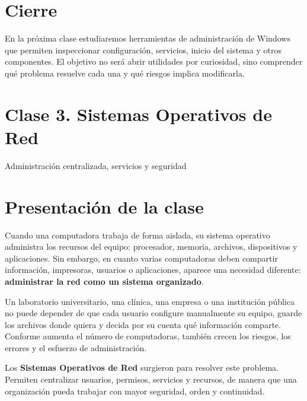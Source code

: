 \documentclass[
  spanish,
  letterpaper,
]{scrbook}
\begin{document}
\chapter{Cierre}\label{cierre}

En la próxima clase estudiaremos herramientas de administración de
Windows que permiten inspeccionar configuración, servicios, inicio del
sistema y otros componentes. El objetivo no será abrir utilidades por
curiosidad, sino comprender qué problema resuelve cada una y qué riesgos
implica modificarla.


\chapter{Clase 3. Sistemas Operativos de
Red}\label{clase-3.-sistemas-operativos-de-red}

Administración centralizada, servicios y seguridad

\hfill\break


\chapter{Presentación de la clase}\label{presentaciuxf3n-de-la-clase-2}

Cuando una computadora trabaja de forma aislada, su sistema operativo
administra los recursos del equipo: procesador, memoria, archivos,
dispositivos y aplicaciones. Sin embargo, en cuanto varias computadoras
deben compartir información, impresoras, usuarios o aplicaciones,
aparece una necesidad diferente: \textbf{administrar la red como un
sistema organizado}.

Un laboratorio universitario, una clínica, una empresa o una institución
pública no puede depender de que cada usuario configure manualmente su
equipo, guarde los archivos donde quiera y decida por su cuenta qué
información comparte. Conforme aumenta el número de computadoras,
también crecen los riesgos, los errores y el esfuerzo de administración.

Los \textbf{Sistemas Operativos de Red} surgieron para resolver este
problema. Permiten centralizar usuarios, permisos, servicios y recursos,
de manera que una organización pueda trabajar con mayor seguridad, orden
y continuidad.
\end{document}
